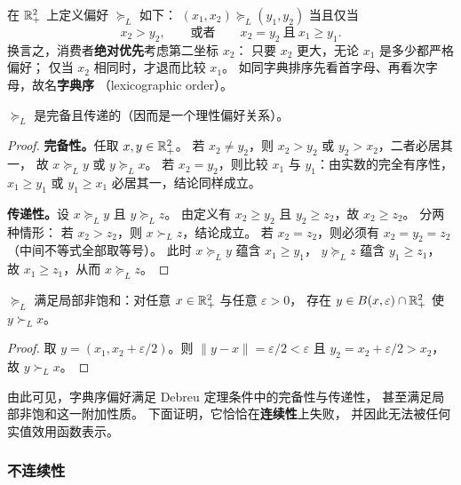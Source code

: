 \begin{definition}[字典序偏好]\label{def:lexicographic}
在 $\mathbb{R}^2_+$ 上定义偏好 $\succeq_L$ 如下：
$(x_1,x_2)\succeq_L (y_1,y_2)$ 当且仅当
\[
  x_2>y_2,\qquad\text{或者}\qquad x_2=y_2 \ \text{且}\ x_1\geq y_1.
\]
换言之，消费者\textbf{绝对优先}考虑第二坐标 $x_2$：
只要 $x_2$ 更大，无论 $x_1$ 是多少都严格偏好；
仅当 $x_2$ 相同时，才退而比较 $x_1$。
如同字典排序先看首字母、再看次字母，故名\textbf{字典序}
（lexicographic order）。
\end{definition}

\begin{proposition}[字典序偏好的完备性与传递性]\label{prop:lex-rational}
$\succeq_L$ 是完备且传递的（因而是一个理性偏好关系）。
\end{proposition}

\begin{proof}
\textbf{完备性。}任取 $x,y\in\mathbb{R}^2_+$。
若 $x_2\neq y_2$，则 $x_2>y_2$ 或 $y_2>x_2$，二者必居其一，
故 $x\succeq_L y$ 或 $y\succeq_L x$。
若 $x_2=y_2$，则比较 $x_1$ 与 $y_1$：由实数的完全有序性，
$x_1\geq y_1$ 或 $y_1\geq x_1$ 必居其一，结论同样成立。

\textbf{传递性。}设 $x\succeq_L y$ 且 $y\succeq_L z$。
由定义有 $x_2\geq y_2$ 且 $y_2\geq z_2$，故 $x_2\geq z_2$。
分两种情形：
若 $x_2>z_2$，则 $x\succ_L z$，结论成立。
若 $x_2=z_2$，则必须有 $x_2=y_2=z_2$
（中间不等式全部取等号）。
此时 $x\succeq_L y$ 蕴含 $x_1\geq y_1$，
$y\succeq_L z$ 蕴含 $y_1\geq z_1$，
故 $x_1\geq z_1$，从而 $x\succeq_L z$。
\end{proof}

\begin{proposition}[字典序偏好的局部非饱和性]\label{prop:lex-nonsatiation}
$\succeq_L$ 满足局部非饱和：对任意 $x\in\mathbb{R}^2_+$ 与任意 $\varepsilon>0$，
存在 $y\in B(x,\varepsilon)\cap\mathbb{R}^2_+$ 使 $y\succ_L x$。
\end{proposition}

\begin{proof}
取 $y=(x_1, x_2+\varepsilon/2)$。则 $\|y-x\|=\varepsilon/2<\varepsilon$
且 $y_2=x_2+\varepsilon/2>x_2$，故 $y\succ_L x$。
\end{proof}

由此可见，字典序偏好满足 Debreu 定理条件中的完备性与传递性，
甚至满足局部非饱和这一附加性质。
下面证明，它恰恰在\textbf{连续性}上失败，
并因此无法被任何实值效用函数表示。

\subsubsection{不连续性}
\label{subsec:lex-discontinuity}

